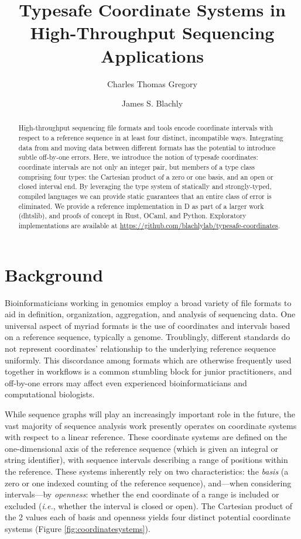 \documentclass[12pt]{article}
\title{Typesafe Coordinate Systems in High-Throughput Sequencing Applications}
\author[1]{\small Charles Thomas Gregory}
\author[1,2,3]{\small James S. Blachly}
\affil[1]{\footnotesize The Ohio State University Comprehensive Cancer Center}
\affil[2]{\footnotesize The Ohio State University Department of Internal Medicine, Division of Hematology}
\affil[3]{\footnotesize The Ohio State University Department of Biomedical Informatics}
\begin{document}
\maketitle

\begin{abstract}
High-throughput sequencing file formats and tools encode coordinate intervals with respect to a reference sequence in at least four distinct, incompatible ways. Integrating data from and moving data between different formats has the potential to introduce subtle off-by-one errors. Here, we introduce the notion of typesafe coordinates: coordinate intervals are not only an integer pair, but members of a type class comprising four types: the Cartesian product of a zero or one basis, and an open or closed interval end. By leveraging the type system of statically and strongly-typed, compiled languages we can provide static guarantees that an entire class of error is eliminated. We provide a reference implementation in D as part of a larger work (dhtslib), and proofs of concept in Rust, OCaml, and Python. Exploratory implementations are available at \url{https://github.com/blachlylab/typesafe-coordinates}.
\end{abstract}

\doublespacing

\section*{Background}

Bioinformaticians working in genomics employ a broad variety of file formats to aid in definition, organization, aggregation, and analysis of sequencing data. One universal aspect of myriad formats is the use of coordinates and intervals based on a reference sequence, typically a genome. Troublingly, different standards do not represent coordinates’ relationship to the underlying reference sequence uniformly. This discordance among formats which are otherwise frequently used together in workflows is a common stumbling block for junior practitioners, and off-by-one errors may affect even experienced bioinformaticians and computational biologists.

While  sequence graphs will play an increasingly important role in the future,\cite{Paten01052017} the vast majority of sequence analysis work presently operates on coordinate systems with respect to a linear reference. These coordinate systems are defined on the one-dimensional axis of the reference sequence (which is given an integral or string identifier), with sequence intervals describing a range of positions within the reference. These systems inherently rely on two characteristics: the \textit{basis} (a zero or one indexed counting of the reference sequence), and---when considering intervals---by \textit{openness}: whether the end coordinate of a range is included or excluded (\textit{i.e.}, whether the interval is closed or open). The Cartesian product of the 2 values each of basis and openness yields four distinct potential coordinate systems (Figure \ref{fig:coordinatesystems}).
\end{document}
